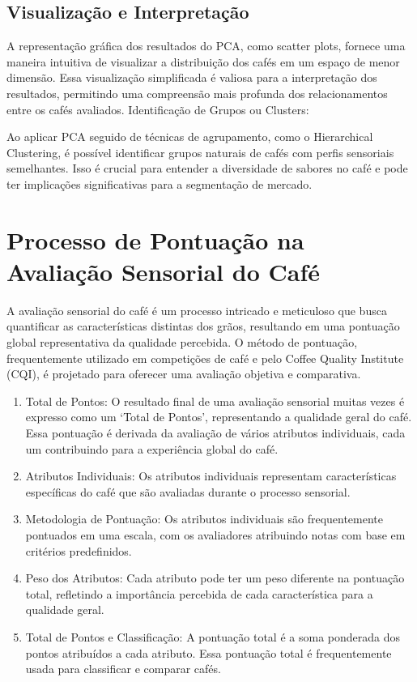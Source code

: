 \documentclass{article}
\begin{document}
\subsection{Visualização e Interpretação}

A representação gráfica dos resultados do PCA, como scatter plots, fornece uma maneira intuitiva de visualizar a distribuição dos cafés em um espaço de menor dimensão. Essa visualização simplificada é valiosa para a interpretação dos resultados, permitindo uma compreensão mais profunda dos relacionamentos entre os cafés avaliados.
Identificação de Grupos ou Clusters:

Ao aplicar PCA seguido de técnicas de agrupamento, como o Hierarchical Clustering, é possível identificar grupos naturais de cafés com perfis sensoriais semelhantes. Isso é crucial para entender a diversidade de sabores no café e pode ter implicações significativas para a segmentação de mercado.

\section{Processo de Pontuação na Avaliação Sensorial do Café}

A avaliação sensorial do café é um processo intricado e meticuloso que busca quantificar as características distintas dos grãos, resultando em uma pontuação global representativa da qualidade percebida. O método de pontuação, frequentemente utilizado em competições de café e pelo Coffee Quality Institute (CQI), é projetado para oferecer uma avaliação objetiva e comparativa.

\begin{enumerate}
    \item Total de Pontos: O resultado final de uma avaliação sensorial muitas vezes é expresso como um `Total de Pontos', representando a qualidade geral do café. Essa pontuação é derivada da avaliação de vários atributos individuais, cada um contribuindo para a experiência global do café.
    \item Atributos Individuais: Os atributos individuais representam características específicas do café que são avaliadas durante o processo sensorial.
    \item Metodologia de Pontuação: Os atributos individuais são frequentemente pontuados em uma escala, com os avaliadores atribuindo notas com base em critérios predefinidos.
    \item Peso dos Atributos: Cada atributo pode ter um peso diferente na pontuação total, refletindo a importância percebida de cada característica para a qualidade geral.
    \item Total de Pontos e Classificação: A pontuação total é a soma ponderada dos pontos atribuídos a cada atributo. Essa pontuação total é frequentemente usada para classificar e comparar cafés.
\end{enumerate}
\end{document}
